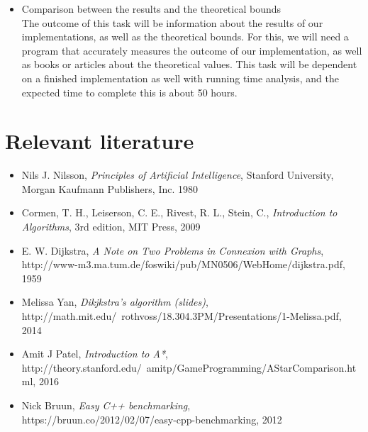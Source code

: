 \documentclass[11pt]{article}
\begin{document}
\begin{itemize}
\item Comparison between the results and the theoretical bounds\\
The outcome of this task will be information about the results of our implementations, as well as the theoretical bounds. For this, we will need a program that accurately measures the outcome of our implementation, as well as books or articles about the theoretical values. This task will be dependent on a finished implementation as well with running time analysis, and the expected time to complete this is about 50 hours.

\end{itemize}

\section{Relevant literature}
\begin{itemize}
\item Nils J. Nilsson, \textit{Principles of Artificial Intelligence}, Stanford University, Morgan Kaufmann Publishers, Inc. 1980

\item Cormen, T. H., Leiserson, C. E., Rivest, R. L., Stein, C., \textit{Introduction to Algorithms}, 3rd edition, MIT Press, 2009

\item E. W. Dijkstra, \textit{A Note on Two Problems in Connexion with Graphs}, \\ http://www-m3.ma.tum.de/foswiki/pub/MN0506/WebHome/dijkstra.pdf, 1959

\item Melissa Yan, \textit{Dikjkstra's algorithm (slides)}, \\ http://math.mit.edu/~rothvoss/18.304.3PM/Presentations/1-Melissa.pdf, 2014

\item Amit J Patel, \textit{Introduction to A*}, \\ http://theory.stanford.edu/~amitp/GameProgramming/AStarComparison.html, 2016

\item Nick Bruun, \textit{Easy C++ benchmarking}, \\ https://bruun.co/2012/02/07/easy-cpp-benchmarking, 2012

\end{itemize}
\end{document}
